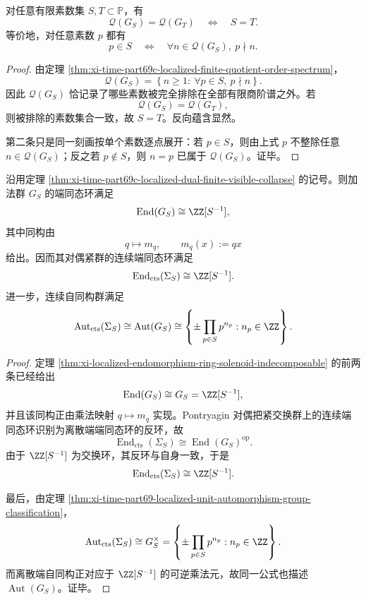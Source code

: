 \begin{corollary}[有限商轮廓对素数账本的完全恢复]\label{cor:xi-time-part69c-localized-finite-quotient-profile-recovers-primes}
对任意有限素数集 \(S,T\subset\mathbb P\)，有
\[
\mathcal Q(G_S)=\mathcal Q(G_T)
\quad\Longleftrightarrow\quad
S=T.
\]
等价地，对任意素数 \(p\) 都有
\[
p\in S
\quad\Longleftrightarrow\quad
\forall n\in \mathcal Q(G_S),\ p\nmid n.
\]
\end{corollary}
\begin{proof}
由定理 \ref{thm:xi-time-part69c-localized-finite-quotient-order-spectrum}，
\[
\mathcal Q(G_S)
=
\left\{
n\ge 1:\ \forall p\in S,\ p\nmid n
\right\}.
\]
因此 \(\mathcal Q(G_S)\) 恰记录了哪些素数被完全排除在全部有限商阶谱之外。若
\[
\mathcal Q(G_S)=\mathcal Q(G_T),
\]
则被排除的素数集合一致，故 \(S=T\)。反向蕴含显然。

第二条只是同一刻画按单个素数逐点展开：若 \(p\in S\)，则由上式 \(p\) 不整除任意 \(n\in\mathcal Q(G_S)\)；反之若 \(p\notin S\)，则 \(n=p\) 已属于 \(\mathcal Q(G_S)\)。证毕。
\end{proof}

\begin{theorem}[局部化数系的连续自同态环完全由局部化环穷尽]\label{thm:xi-time-part69c-localized-dual-endomorphism-ring-exhaustion}
沿用定理 \ref{thm:xi-time-part69c-localized-dual-finite-visible-collapse} 的记号。则加法群 \(G_S\) 的端同态环满足
\[
\operatorname{End}(G_S)\cong \ZZ[S^{-1}],
\]
其中同构由
\[
q\longmapsto m_q,
\qquad
m_q(x):=qx
\]
给出。因而其对偶紧群的连续端同态环满足
\[
\operatorname{End}_{\mathrm{cts}}(\Sigma_S)\cong \ZZ[S^{-1}].
\]
进一步，连续自同构群满足
\[
\operatorname{Aut}_{\mathrm{cts}}(\Sigma_S)
\cong
\operatorname{Aut}(G_S)
\cong
\left\{
\pm\prod_{p\in S}p^{n_p}: n_p\in\ZZ
\right\}.
\]
\end{theorem}
\begin{proof}
定理 \ref{thm:xi-localized-endomorphism-ring-solenoid-indecomposable} 的前两条已经给出
\[
\operatorname{End}(G_S)\cong G_S=\ZZ[S^{-1}],
\]
并且该同构正由乘法映射 \(q\mapsto m_q\) 实现。Pontryagin 对偶把紧交换群上的连续端同态环识别为离散端端同态环的反环，故
\[
\operatorname{End}_{\mathrm{cts}}(\Sigma_S)\cong \operatorname{End}(G_S)^{\mathrm{op}}.
\]
由于 \(\ZZ[S^{-1}]\) 为交换环，其反环与自身一致，于是
\[
\operatorname{End}_{\mathrm{cts}}(\Sigma_S)\cong \ZZ[S^{-1}].
\]

最后，由定理 \ref{thm:xi-time-part69-localized-unit-automorphism-group-classification}，
\[
\operatorname{Aut}_{\mathrm{cts}}(\Sigma_S)
\cong
G_S^\times
=
\left\{
\pm\prod_{p\in S}p^{n_p}: n_p\in\ZZ
\right\}.
\]
而离散端自同构正对应于 \(\ZZ[S^{-1}]\) 的可逆乘法元，故同一公式也描述 \(\operatorname{Aut}(G_S)\)。证毕。
\end{proof}

